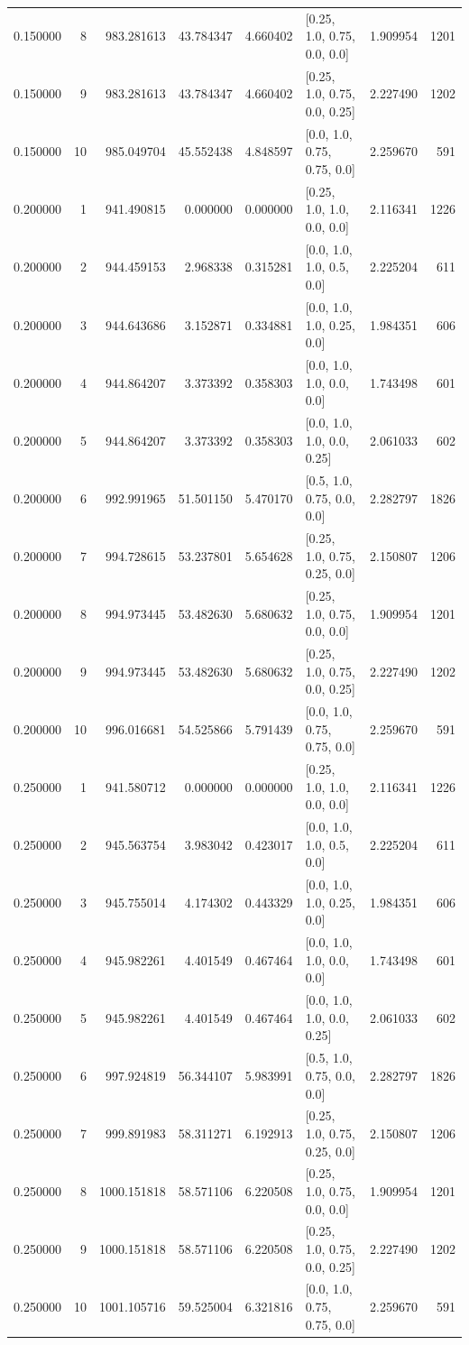 \begin{tabular}{rrrrrlrr}
0.150000 & 8 & 983.281613 & 43.784347 & 4.660402 & [0.25, 1.0, 0.75, 0.0, 0.0] & 1.909954 & 1201 \\
0.150000 & 9 & 983.281613 & 43.784347 & 4.660402 & [0.25, 1.0, 0.75, 0.0, 0.25] & 2.227490 & 1202 \\
0.150000 & 10 & 985.049704 & 45.552438 & 4.848597 & [0.0, 1.0, 0.75, 0.75, 0.0] & 2.259670 & 591 \\
0.200000 & 1 & 941.490815 & 0.000000 & 0.000000 & [0.25, 1.0, 1.0, 0.0, 0.0] & 2.116341 & 1226 \\
0.200000 & 2 & 944.459153 & 2.968338 & 0.315281 & [0.0, 1.0, 1.0, 0.5, 0.0] & 2.225204 & 611 \\
0.200000 & 3 & 944.643686 & 3.152871 & 0.334881 & [0.0, 1.0, 1.0, 0.25, 0.0] & 1.984351 & 606 \\
0.200000 & 4 & 944.864207 & 3.373392 & 0.358303 & [0.0, 1.0, 1.0, 0.0, 0.0] & 1.743498 & 601 \\
0.200000 & 5 & 944.864207 & 3.373392 & 0.358303 & [0.0, 1.0, 1.0, 0.0, 0.25] & 2.061033 & 602 \\
0.200000 & 6 & 992.991965 & 51.501150 & 5.470170 & [0.5, 1.0, 0.75, 0.0, 0.0] & 2.282797 & 1826 \\
0.200000 & 7 & 994.728615 & 53.237801 & 5.654628 & [0.25, 1.0, 0.75, 0.25, 0.0] & 2.150807 & 1206 \\
0.200000 & 8 & 994.973445 & 53.482630 & 5.680632 & [0.25, 1.0, 0.75, 0.0, 0.0] & 1.909954 & 1201 \\
0.200000 & 9 & 994.973445 & 53.482630 & 5.680632 & [0.25, 1.0, 0.75, 0.0, 0.25] & 2.227490 & 1202 \\
0.200000 & 10 & 996.016681 & 54.525866 & 5.791439 & [0.0, 1.0, 0.75, 0.75, 0.0] & 2.259670 & 591 \\
0.250000 & 1 & 941.580712 & 0.000000 & 0.000000 & [0.25, 1.0, 1.0, 0.0, 0.0] & 2.116341 & 1226 \\
0.250000 & 2 & 945.563754 & 3.983042 & 0.423017 & [0.0, 1.0, 1.0, 0.5, 0.0] & 2.225204 & 611 \\
0.250000 & 3 & 945.755014 & 4.174302 & 0.443329 & [0.0, 1.0, 1.0, 0.25, 0.0] & 1.984351 & 606 \\
0.250000 & 4 & 945.982261 & 4.401549 & 0.467464 & [0.0, 1.0, 1.0, 0.0, 0.0] & 1.743498 & 601 \\
0.250000 & 5 & 945.982261 & 4.401549 & 0.467464 & [0.0, 1.0, 1.0, 0.0, 0.25] & 2.061033 & 602 \\
0.250000 & 6 & 997.924819 & 56.344107 & 5.983991 & [0.5, 1.0, 0.75, 0.0, 0.0] & 2.282797 & 1826 \\
0.250000 & 7 & 999.891983 & 58.311271 & 6.192913 & [0.25, 1.0, 0.75, 0.25, 0.0] & 2.150807 & 1206 \\
0.250000 & 8 & 1000.151818 & 58.571106 & 6.220508 & [0.25, 1.0, 0.75, 0.0, 0.0] & 1.909954 & 1201 \\
0.250000 & 9 & 1000.151818 & 58.571106 & 6.220508 & [0.25, 1.0, 0.75, 0.0, 0.25] & 2.227490 & 1202 \\
0.250000 & 10 & 1001.105716 & 59.525004 & 6.321816 & [0.0, 1.0, 0.75, 0.75, 0.0] & 2.259670 & 591 \\
\bottomrule
\end{tabular}
